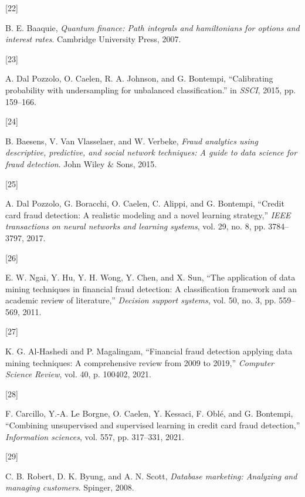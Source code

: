 \documentclass[
  12pt,
  letterpaper,
]{book}
\newlength{\cslhangindent}
\newlength{\csllabelwidth}
\newenvironment{CSLReferences}[2] %
 {\begin{list}{}{%
  \setlength{\itemindent}{0pt}
  \setlength{\leftmargin}{0pt}
  \setlength{\parsep}{0pt}
  \ifodd #1
   \setlength{\leftmargin}{\cslhangindent}
   \setlength{\itemindent}{-1\cslhangindent}
  \fi
  \setlength{\itemsep}{#2\baselineskip}}}
 {\end{list}}
\newcommand{\CSLLeftMargin}[1]{\parbox[t]{\csllabelwidth}{\strut#1\strut}}
\newcommand{\CSLRightInline}[1]{\parbox[t]{\linewidth - \csllabelwidth}{\strut#1\strut}}
\begin{document}
\begin{CSLReferences}{0}{0}
\CSLLeftMargin{{[}22{]} }%
\CSLRightInline{B. E. Baaquie, \emph{Quantum finance: Path integrals and
hamiltonians for options and interest rates}. Cambridge University
Press, 2007.}

\CSLLeftMargin{{[}23{]} }%
\CSLRightInline{A. Dal Pozzolo, O. Caelen, R. A. Johnson, and G.
Bontempi, {``Calibrating probability with undersampling for unbalanced
classification.''} in \emph{SSCI}, 2015, pp. 159--166.}

\CSLLeftMargin{{[}24{]} }%
\CSLRightInline{B. Baesens, V. Van Vlasselaer, and W. Verbeke,
\emph{Fraud analytics using descriptive, predictive, and social network
techniques: A guide to data science for fraud detection}. John Wiley \&
Sons, 2015.}

\CSLLeftMargin{{[}25{]} }%
\CSLRightInline{A. Dal Pozzolo, G. Boracchi, O. Caelen, C. Alippi, and
G. Bontempi, {``Credit card fraud detection: A realistic modeling and a
novel learning strategy,''} \emph{IEEE transactions on neural networks
and learning systems}, vol. 29, no. 8, pp. 3784--3797, 2017.}

\CSLLeftMargin{{[}26{]} }%
\CSLRightInline{E. W. Ngai, Y. Hu, Y. H. Wong, Y. Chen, and X. Sun,
{``The application of data mining techniques in financial fraud
detection: A classification framework and an academic review of
literature,''} \emph{Decision support systems}, vol. 50, no. 3, pp.
559--569, 2011.}

\CSLLeftMargin{{[}27{]} }%
\CSLRightInline{K. G. Al-Hashedi and P. Magalingam, {``Financial fraud
detection applying data mining techniques: A comprehensive review from
2009 to 2019,''} \emph{Computer Science Review}, vol. 40, p. 100402,
2021.}

\CSLLeftMargin{{[}28{]} }%
\CSLRightInline{F. Carcillo, Y.-A. Le Borgne, O. Caelen, Y. Kessaci, F.
Oblé, and G. Bontempi, {``Combining unsupervised and supervised learning
in credit card fraud detection,''} \emph{Information sciences}, vol.
557, pp. 317--331, 2021.}

\CSLLeftMargin{{[}29{]} }%
\CSLRightInline{C. B. Robert, D. K. Byung, and A. N. Scott,
\emph{Database marketing: Analyzing and managing customers}. Spinger,
2008.}


\end{CSLReferences}
\end{document}
